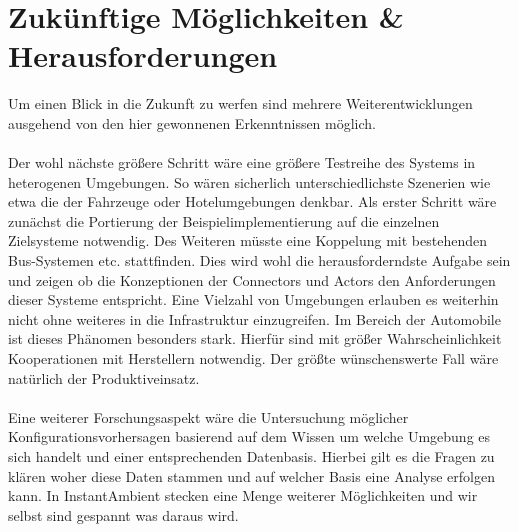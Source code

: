 \section{Zukünftige Möglichkeiten & Herausforderungen}
Um einen Blick in die Zukunft zu werfen sind mehrere Weiterentwicklungen ausgehend von den hier gewonnenen Erkenntnissen möglich. 
\\\\
Der wohl nächste größere Schritt wäre eine größere Testreihe des Systems in heterogenen Umgebungen. So wären sicherlich unterschiedlichste Szenerien wie etwa die der Fahrzeuge oder Hotelumgebungen denkbar. Als erster Schritt wäre zunächst die Portierung der Beispielimplementierung auf die einzelnen Zielsysteme notwendig. Des Weiteren müsste eine Koppelung mit bestehenden Bus-Systemen etc. stattfinden. Dies wird wohl die herausforderndste Aufgabe sein und zeigen ob die Konzeptionen der Connectors und Actors den Anforderungen dieser Systeme entspricht. Eine Vielzahl von Umgebungen erlauben es weiterhin nicht ohne weiteres in die Infrastruktur einzugreifen. Im Bereich der Automobile ist dieses Phänomen besonders stark. Hierfür sind mit größer Wahrscheinlichkeit Kooperationen mit Herstellern notwendig. Der größte wünschenswerte Fall wäre natürlich der Produktiveinsatz. 
\\\\
Eine weiterer Forschungsaspekt wäre die Untersuchung möglicher Konfigurationsvorhersagen basierend auf dem Wissen um welche Umgebung es sich handelt und einer entsprechenden Datenbasis. Hierbei gilt es die Fragen zu klären woher diese Daten stammen und auf welcher Basis eine Analyse erfolgen kann. In InstantAmbient stecken eine Menge weiterer Möglichkeiten und wir selbst sind gespannt was daraus wird. 